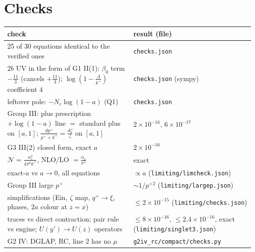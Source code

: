 \documentclass[10pt]{article}
\numberwithin{equation}{section}
\begin{document}
\section{Checks}\label{sec:checks}
\begin{center}\small
\begin{tabular}{@{}p{}p{}@{}}\toprule
check & result (file)\\\midrule
25 of 30 equations identical to the verified ones & \texttt{checks.json}\\
$2b$ UV in the form of G1 II(1): $\beta_0$ term $-\frac{11}{3}$ (cancels $+\frac{11}{3}$); $\log(1-\frac\Lambda{k^+})$ coefficient $4$ & \texttt{checks.json} (sympy)\\
leftover pole: $-N_c\log(1-a)$ (Q1) & \texttt{checks.json}\\
Group III: plus prescription $+\log(1-a)$ line $=$ standard plus on $[a,1]$; $\frac{dp^+}{p^++k^+}=\frac{d\zeta}\zeta$ on $[a,1]$ & $2\times10^{-16}$, $6\times10^{-17}$\\
G3 III(2) closed form, exact $a$ & $2\times10^{-16}$\\
$\mathcal N=\frac{\alpha_s^2}{4\pi^6k^+}$, NLO/LO $=\frac{\alpha_s}{\pi^2}$ & exact\\
exact-$a$ vs $a\to0$, all equations & $\propto a$ (\texttt{limiting/limcheck.json})\\
Group III large $p^+$ & $\sim1/p^{+2}$ (\texttt{limiting/largep.json})\\
simplifications (Ein, $\zeta$ map, $q^+\to\xi$, phases, $2a$ colour at $z=x$) & $\le2\times10^{-15}$ (\texttt{limiting/checks.json})\\
traces vs direct contraction; pair rule vs engine; $U(y')\to U(z)$ operators & $\le8\times10^{-16}$, $\le2.4\times10^{-16}$, exact (\texttt{limiting/singlet3.json})\\
G2 IV: DGLAP, RC, line 2 has no $\mu$ & \texttt{g2iv\_rc/compact/checks.py}\\\bottomrule
\end{tabular}
\end{center}
\end{document}
